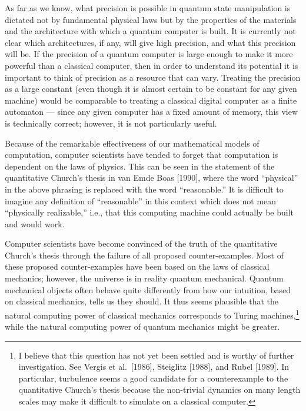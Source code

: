 As far as we know, what 
precision is possible in quantum state manipulation is dictated not by 
fundamental physical laws but by the properties of the materials and 
the architecture with which a quantum computer is built.  It is
currently not clear which architectures, if any, will give high precision,
and what this precision will be.  If the precision
of a quantum computer
is large enough to make it more powerful than a classical computer,
then in order to understand its potential 
it is important to think of precision as a resource that can vary.  
Treating the precision as a large constant (even though it is almost
certain to be constant for any given machine) would be comparable to 
treating a classical digital computer as a finite automaton --- since 
any given computer has a fixed amount of memory, this view 
is technically correct; however, it is not particularly useful.

Because of the remarkable effectiveness of our mathematical models of 
computation, computer scientists have tended to forget that computation
is dependent on the laws of physics.  This can be seen in the 
statement of the quantitative Church's thesis in van Emde Boas [1990], where 
the word ``physical'' in the above phrasing is replaced with the word 
``reasonable.'' It is difficult to imagine any definition of 
``reasonable'' in this context which does not mean ``physically realizable,''
i.e., that this computing machine could actually be built and would work.

Computer scientists have become convinced of the truth of the
quantitative Church's thesis through the failure of all proposed
counter-examples.  Most of these proposed counter-examples have 
been based on the laws of classical mechanics; however, the 
universe is in reality
quantum mechanical.  Quantum mechanical objects often behave 
quite differently from how our intuition, based on classical mechanics, tells
us they should.  It thus seems plausible that the natural 
computing power of classical mechanics corresponds to Turing 
machines,\footnote{I believe that this question has not yet been settled 
and is worthy of further investigation.  See
Vergis et al.\ [1986], Steiglitz [1988], and Rubel [1989].  In particular, 
turbulence seems a good
candidate for a counterexample to the quantitative Church's thesis 
because the non-trivial dynamics on many length scales may make it
difficult to simulate on a classical computer.} 
while the natural computing power of 
quantum mechanics might be greater.  

